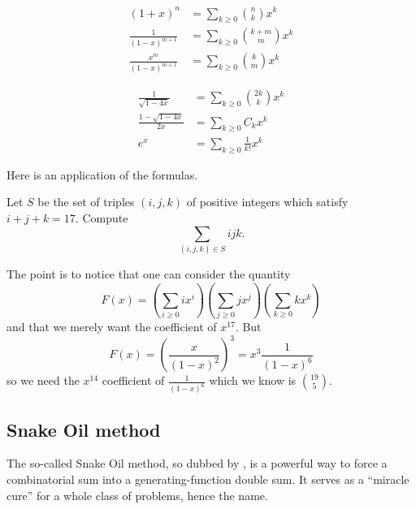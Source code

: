 \documentclass[11pt]{scrartcl}
\begin{document}
\begin{table}[ht]
  \centering
  \begin{minipage}{0.4\textwidth}
  \begin{align*}
    (1+x)^n &= \sum_{k \ge 0} \binom{n}{k} x^k \\
    \frac{1}{(1-x)^{m+1}}
      &= \sum_{k \ge 0} \binom{k+m}{m} x^k \\
    \frac{x^m}{(1-x)^{m+1}}
      &= \sum_{k \ge 0} \binom{k}{m} x^k
  \end{align*}
  \end{minipage}
  \qquad
  \begin{minipage}{0.4\textwidth}
  \begin{align*}
    \frac{1}{\sqrt{1-4x}} &= \sum_{k \ge 0} \binom{2k}{k} x^k \\
    \frac{1-\sqrt{1-4x}}{2x} &= \sum_{k \ge 0} C_k x^k \\
    e^x &= \sum_{k \ge 0} \frac{1}{k!} x^k
  \end{align*}
  \end{minipage}
  \caption{Table of common generating functions}
  \label{tab:genfunc}
\end{table}

Here is an application of the formulas.
\begin{example}
  Let $S$ be the set of triples $(i,j,k)$ of positive integers
  which satisfy $i+j+k=17$. Compute
  \[ \sum_{(i,j,k) \in S} ijk. \]
\end{example}
\begin{soln}
  The point is to notice that one can consider the quantity
  \[
    F(x)
    =
    \left( \sum_{i \ge 0} i x^i \right)
    \left( \sum_{j \ge 0} j x^j \right)
    \left( \sum_{k \ge 0} k x^k \right)
  \]
  and that we merely want the coefficient of $x^{17}$.
  But
  \[
    F(x) = \left( \frac{x}{(1-x)^2} \right)^3
    = x^3 \frac{1}{(1-x)^6}
  \]
  so we need the $x^{14}$ coefficient of $\frac{1}{(1-x)^6}$
  which we know is $\binom{19}{5}$.
\end{soln}

\subsection{Snake Oil method}
The so-called Snake Oil method, so dubbed by \cite{ref:gfo},
is a powerful way to force a combinatorial sum into a
generating-function double sum.
It serves as a ``miracle cure'' for a whole class of problems, hence the name.
\end{document}
